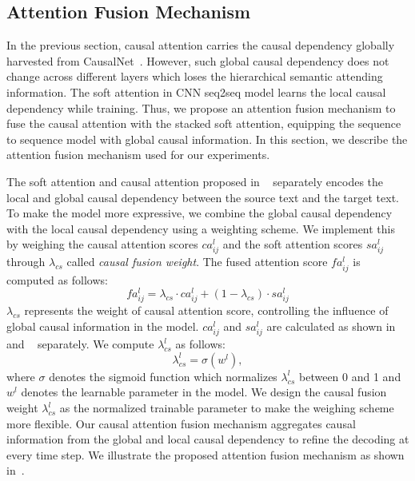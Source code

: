 \subsection{Attention Fusion Mechanism}
\label{sec:fusion}
In the previous section, causal attention
carries the causal dependency globally harvested from CausalNet~\cite{LuoSZHW16}.
However, such global causal dependency does not change across different layers which loses the hierarchical semantic attending information.
The soft attention in CNN seq2seq model learns the 
local causal dependency while training.
Thus, we propose an attention fusion mechanism 
to fuse the causal attention with the stacked soft attention, equipping the sequence to sequence model with global causal information.
In this section, we describe the attention fusion mechanism used for our experiments.


The soft attention and causal attention proposed in ~ separately encodes the local and global causal dependency between the source text and the target text.
To make the model more expressive, 
we combine the global causal dependency with the local causal dependency using a weighting scheme.
We implement this by weighing the causal attention scores
$ca^l_{ij}$ and the soft attention scores $sa^l_{ij}$ through  $\lambda_{cs}$ called \emph{causal fusion weight}.
The fused attention score $fa^l_{ij}$ is computed as follows:
\begin{equation}
\label{eq:fusion}
fa^l_{ij} = \lambda_{cs} \cdot ca^l_{ij} + (1-\lambda_{cs}) \cdot sa^l_{ij}
\end{equation}
$\lambda_{cs}$ represents the weight of causal attention score, controlling the influence of global causal information in the model.
$ca^l_{ij}$ and $sa^l_{ij}$ are calculated as shown in
~ and ~ separately.
We compute $\lambda^l_{cs}$ as follows:
\begin{equation}
\label{eq:weight}
\lambda^l_{cs} = \sigma(w^l),
\end{equation}
where $\sigma$ denotes the sigmoid function which 
normalizes $\lambda^l_{cs}$ between 0 and 1
and $w^l$ denotes the learnable parameter in the model.
We design the causal fusion weight $\lambda^l_{cs}$ as the normalized trainable parameter
to make the weighing scheme more flexible.  
Our causal attention fusion mechanism aggregates causal information from the global and local causal dependency to refine the decoding at every time step. 
We illustrate the proposed attention fusion mechanism
as shown in~.

